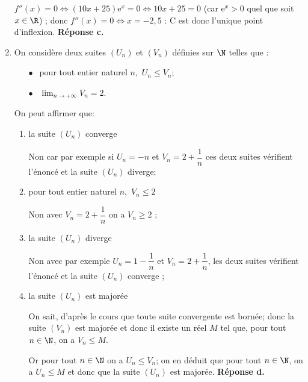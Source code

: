 \begin{enumerate}
$f''(x) = 0 \iff (10x + 25)\text{e}^x = 0 \iff 10x + 25 = 0$ (car $\text{e}^x > 0$ quel que soit $x \in \R$) ; donc 
$f''(x) = 0 \iff x = - 2,5$ : C est donc l'unique point d'inflexion. \hfill \textbf{Réponse c.}

\item On considère deux suites $\left(U_n\right)$ et  $\left(V_n\right)$ définies sur $\N$ telles que : 

\setlength\parindent{1cm}
\begin{itemize}
\item[$\bullet~~$] pour tout entier naturel $n$,\, $U_n \leqslant V_n$;
\item[$\bullet~~$] $\displaystyle\lim_{n \to+ \infty}  V_n= 2$.
\end{itemize}
\setlength\parindent{0cm}

On peut affirmer que:

	\begin{enumerate}
		\item la suite $\left(U_n\right)$ converge
		
		Non car par exemple si $U_n = - n$ et $V_n = 2 + \dfrac{1}{n}$ ces deux suites vérifient l'énoncé et la suite $\left(U_n\right)$ diverge;
		\item pour tout entier naturel $n$,\, $V_n \leqslant 2$ 
		
		Non avec $V_n = 2 + \dfrac{1}{n}$ on a $V_n \geqslant 2$ ;	
		\item la suite $\left(U_n\right)$ diverge
		
		Non avec par exemple $U_n = 1 - \dfrac{1}{n}$ et $V_n = 2 + \dfrac{1}{n}$, les deux suites vérifient l'énoncé et la suite $\left(U_n\right)$ converge ;
		\item la suite $\left(U_n\right)$ est majorée
		
On sait, d'après le cours que toute suite convergente est bornée; donc la suite $(V_n)$ est majorée et donc il existe un réel $M$ tel que, pour tout $n\in\N$, on a $V_n\leqslant	 M$.

Or pour tout $n\in\N$ on a $U_n \leqslant V_n$; on en déduit que pour tout $n\in\N$, on a $U_n\leqslant M$ et donc que la suite $(U_n)$ est majorée. \hfill \textbf{Réponse d.}
		
	\end{enumerate} 
\end{enumerate}



